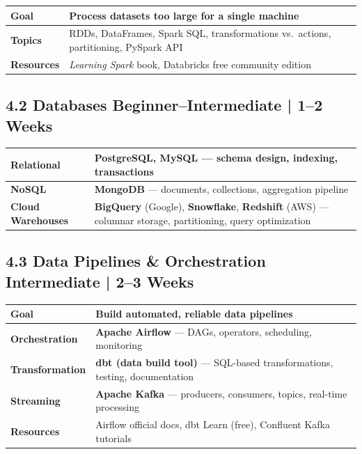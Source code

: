 \documentclass[a4paper,11pt]{article}
\begin{document}
\begin{tabular}{>{\bfseries}p{3cm} p{11.5cm}}
\toprule
Goal & Process datasets too large for a single machine \\
\midrule
Topics & RDDs, DataFrames, Spark SQL, transformations vs.\ actions, partitioning, PySpark API \\
Resources & \textit{Learning Spark} book, Databricks free community edition \\
\bottomrule
\end{tabular}

\subsection{4.2 Databases \hfill \small\normalfont\color{darkgray}Beginner--Intermediate | 1--2 Weeks}

\begin{tabular}{>{\bfseries}p{3cm} p{11.5cm}}
\toprule
Relational & PostgreSQL, MySQL — schema design, indexing, transactions \\
\midrule
NoSQL & \textbf{MongoDB} — documents, collections, aggregation pipeline \\
Cloud Warehouses & \textbf{BigQuery} (Google), \textbf{Snowflake}, \textbf{Redshift} (AWS) — columnar storage, partitioning, query optimization \\
\bottomrule
\end{tabular}

\subsection{4.3 Data Pipelines \& Orchestration \hfill \small\normalfont\color{darkgray}Intermediate | 2--3 Weeks}

\begin{tabular}{>{\bfseries}p{3cm} p{11.5cm}}
\toprule
Goal & Build automated, reliable data pipelines \\
\midrule
Orchestration & \textbf{Apache Airflow} — DAGs, operators, scheduling, monitoring \\
Transformation & \textbf{dbt (data build tool)} — SQL-based transformations, testing, documentation \\
Streaming & \textbf{Apache Kafka} — producers, consumers, topics, real-time processing \\
Resources & Airflow official docs, dbt Learn (free), Confluent Kafka tutorials \\
\bottomrule
\end{tabular}
\end{document}

